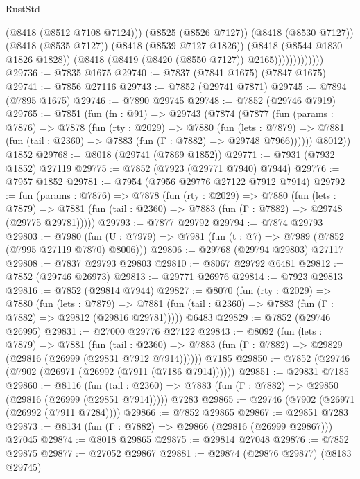 \begin{lexlean}{RustStd}
\begin{coremodule}
                            (@8418 (@8512 @7108 @7124)))
                          (@8525 (@8526 @7127))
                          (@8418 (@8530 @7127))
                          (@8418 (@8535 @7127))
                          (@8418 (@8539 @7127 @1826))
                          (@8418 (@8544 @1830 @1826 @1828))
                          (@8418 (@8419 (@8420 (@8550 @7127)) @2165)))))))))))))
@29736 := @7835 @1675
@29740 := @7837 (@7841 @1675) (@7847 @1675)
@29741 := @7856 @27116
@29743 := @7852 (@29741 @7871)
@29745 := @7894 (@7895 @1675)
@29746 := @7890 @29745
@29748 := @7852 (@29746 @7919)
@29765 := @7851
    (fun (fn : @91) =>
    @29743
      (@7874
        (@7877
          (fun (params : @7876) =>
          @7878
            (fun (rty : @2029) =>
            @7880
              (fun (lets : @7879) =>
              @7881 (fun (tail : @2360) => @7883 (fun (Γ : @7882) => @29748 @7966))))))
        @8012))
    @1852
@29768 := @8018 (@29741 (@7869 @1852))
@29771 := @7931 (@7932 @1852) @27119
@29775 := @7852 (@7923 (@29771 @7940) @7944)
@29776 := @7957 @1852
@29781 := @7954 (@7956 @29776 @27122 @7912 @7914)
@29792 := fun (params : @7876) =>
  @7878
    (fun (rty : @2029) =>
    @7880
      (fun (lets : @7879) =>
      @7881 (fun (tail : @2360) => @7883 (fun (Γ : @7882) => @29748 (@29775 @29781)))))
@29793 := @7877 @29792
@29794 := @7874 @29793
@29803 := @7980
    (fun (U : @7979) => @7981 (fun (t : @7) => @7989 (@7852 (@7995 @27119 @7870) @8006)))
@29806 := @29768 (@29794 @29803) @27117
@29808 := @7837 @29793 @29803
@29810 := @8067 @29792 @6481
@29812 := @7852 (@29746 @26973)
@29813 := @29771 @26976
@29814 := @7923 @29813
@29816 := @7852 (@29814 @7944)
@29827 := @8070
    (fun (rty : @2029) =>
    @7880
      (fun (lets : @7879) =>
      @7881 (fun (tail : @2360) => @7883 (fun (Γ : @7882) => @29812 (@29816 @29781)))))
    @6483
@29829 := @7852 (@29746 @26995)
@29831 := @27000 @29776 @27122
@29843 := @8092
    (fun (lets : @7879) =>
    @7881
      (fun (tail : @2360) =>
      @7883 (fun (Γ : @7882) => @29829 (@29816 (@26999 (@29831 @7912 @7914))))))
    @7185
@29850 := @7852 (@29746 (@7902 (@26971 (@26992 (@7911 (@7186 @7914))))))
@29851 := @29831 @7185
@29860 := @8116
    (fun (tail : @2360) => @7883 (fun (Γ : @7882) => @29850 (@29816 (@26999 (@29851 @7914)))))
    @7283
@29865 := @29746 (@7902 (@26971 (@26992 (@7911 @7284))))
@29866 := @7852 @29865
@29867 := @29851 @7283
@29873 := @8134 (fun (Γ : @7882) => @29866 (@29816 (@26999 @29867))) @27045
@29874 := @8018 @29865
@29875 := @29814 @27048
@29876 := @7852 @29875
@29877 := @27052 @29867
@29881 := @29874 (@29876 @29877) (@8183 @29745)

\end{coremodule}
\end{lexlean}
